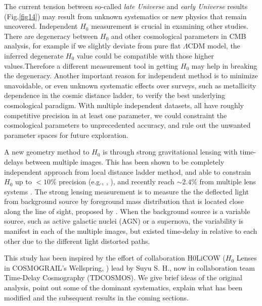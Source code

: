 \documentclass{cosmo}
\begin{document}
    
    The current tension between so-called \emph{late Universe} and \emph{early Universe} results (Fig.\ref{fig14}) may result from unknown systematics or new physics that remain uncovered. Independent $H_\mathrm{0}$ measurement is crucial in examining other studies.
    There are degeneracy between $H_\mathrm{0}$ and other cosmological parameters in CMB analysis, for example if we slightly deviate from pure flat $\Lambda$CDM model, the inferred degenerate $H_\mathrm{0}$ value could be compatible with those higher values.Therefore a different measurement tool in getting $H_\mathrm{0}$ may help in breaking the degeneracy. 
    Another important reason for independent method is to minimize unavoidable, or even unknown systematic effects over surveys, such as metallicity dependence in the cosmic distance ladder, to verify the best underlying cosmological paradigm. With multiple independent datasets, all have roughly competitive precision in at least one parameter, we could constraint the cosmological parameters to unprecedented accuracy, and rule out the unwanted parameter spaces for future exploration.
    
    A new geometry method to $H_\mathrm{0}$ is through strong gravitational lensing with time-delays between multiple images. This has been shown to be completely independent approach from local distance ladder method, and able to constrain $H_\mathrm{0}$ up to $< 10 \%$ precision (e.g., \citealt{Suyu2010}, \citealt{Suyu2014}), and recently reach $\sim 2.4 \%$ from multiple lens systems \citep{Wong2019}. The strong lensing measurement is to measure the the deflected light from background source by foreground mass distribution that is located close along the line of sight, proposed by \cite{Refsdal1964}. When the background source is a variable source, such as active galactic nuclei (AGN) or a supernova, the variability is manifest in each of the multiple images, but existed time-delay in relative to each other due to the different light distorted paths. 
    
    This study has been inspired by the effort of collaboration H0LiCOW ($H_\mathrm{0}$ Lenses in COSMOGRAIL’s Wellspring, \citealt{Suyu2017}) lead by Suyu S. H., now in collaboration team Time-Delay Cosmography (TDCOSMOS). We give brief ideas of the original analysis, point out some of the dominant systematics, explain what has been modified and the subsequent results in the coming sections.
    
\end{document}

